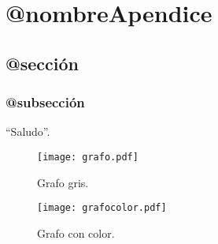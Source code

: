 \chapter{@nombreApendice}
\label{apendiceA}


\section{@sección}
\blindtext

\subsection{@subsección}
\Blindtext

``Saludo''.

\begin{figure}[ht!]
\centering
\texttt{[image: grafo.pdf]}
\caption[Grafo]{Grafo gris.}
\label{imagen:grafo}
\end{figure}

\begin{figure}[ht!]
\centering
\texttt{[image: grafocolor.pdf]}
\caption[Grafo coloreado (esto sale en la tabla de contenidos)]{Grafo con color.}
\label{imagen:grafodecolores}
\end{figure}

